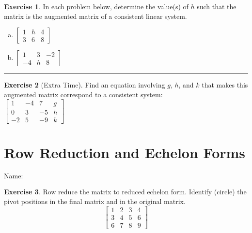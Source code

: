 \documentclass[10pt]{book}
\theoremstyle{definition}
\newtheorem{exercise}{Exercise}[section]
\newcommand{\name}[1][2.5in]{\vspace{-2.3em}\hfill Name: \underline{\hspace{#1}}}
\begin{document}
\begin{exercise} %
	In each problem below, determine the value(s) of $h$ such that the matrix is the augmented matrix of a consistent linear system.
	\begin{multicols}{2}
		\begin{enumerate}[(a)]
			\item
			$\begin{bmatrix}
			1 & h & 4 \\
			3 & 6 & 8
			\end{bmatrix}$
			\item
			$\begin{bmatrix}
			1 & 3 & -2 \\
			-4 & h &  8
			\end{bmatrix}$
		\end{enumerate}
	\end{multicols}
\end{exercise}
\vfill


\hrule

\begin{exercise}[Extra Time] %
	Find an equation involving $g$, $h$, and $k$ that makes this augmented matrix correspond to a consistent system: \\
	
	$\begin{bmatrix}
	 1 & -4 &  7 & g \\
	 0 &  3 & -5 & h \\
	-2 &  5 & -9 & k
	\end{bmatrix}$
\end{exercise}


\newpage



\section{Row Reduction and Echelon Forms}
\name[2in]

\begin{exercise} %
Row reduce the matrix to reduced echelon form. Identify (circle) the pivot positions in the final matrix and in the original matrix.
\[\begin{bmatrix}
	1 & 2 & 3 & 4 \\ 
	3 & 4 & 5 & 6 \\ 
	6 & 7 & 8 & 9
\end{bmatrix}
\]
\end{exercise}
\vfill
\end{document}
